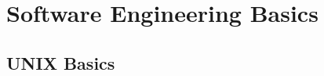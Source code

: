 











\chapter{Software Engineering Basics}
\label{chp:SWEngrBasics}


\section{UNIX Basics}
\label{sec:UNIXBasics}

